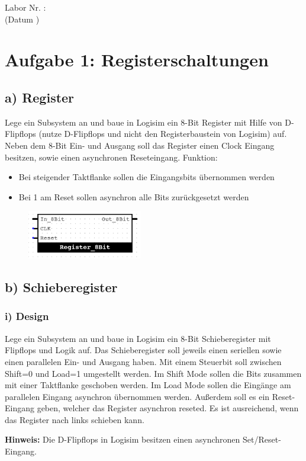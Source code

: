 \documentclass[a4paper]{scrartcl}
\def\header#1#2{
  \begin{center}
    {\Large Labor #1: \TOPIC}\\
    {(Datum #2)}
  \end{center}
}
\begin{document}
\header{Nr. \NUMBER}{\DATE}

\section*{Aufgabe 1: Registerschaltungen}
\subsection*{a) Register}
Lege ein Subsystem an und baue in Logisim ein 8-Bit Register mit Hilfe von D-Flipflops (nutze D-Flipflops und nicht den Registerbaustein von Logisim) auf. 
Neben dem 8-Bit Ein- und Ausgang soll das Register einen Clock Eingang besitzen, sowie einen asynchronen Reseteingang.
Funktion:
\begin{itemize}
  \item Bei steigender Taktflanke sollen die Eingangsbits übernommen werden
  \item Bei 1 am Reset sollen asynchron alle Bits zurückgesetzt werden
\end{itemize}


  \begin{figure}[h]
    \centering
    \includegraphics[width=5cm]{Reg.png}
  \end{figure}

  
\subsection*{b) Schieberegister}
\subsubsection*{i) Design}
Lege ein Subsystem an und baue in Logisim ein 8-Bit Schieberegister mit Flipflops und Logik auf. Das Schieberegister soll 
jeweils einen seriellen sowie einen parallelen Ein- und Ausgang haben. Mit einem Steuerbit soll zwischen Shift=0 und Load=1
umgestellt werden. Im Shift Mode sollen die Bits zusammen mit einer Taktflanke geschoben werden. Im Load Mode sollen die Eingänge 
am parallelen Eingang asynchron übernommen werden. Außerdem soll es ein Reset-Eingang geben,
welcher das Register asynchron reseted. Es ist ausreichend, wenn das Register
nach links schieben kann.

\textbf{Hinweis:} Die D-Flipflops in Logisim besitzen einen asynchronen Set/Reset-Eingang.
\end{document}
